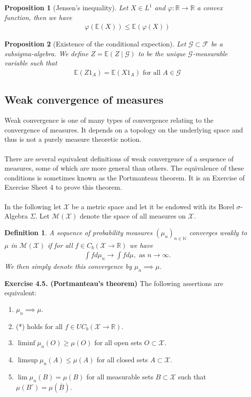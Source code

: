 \documentclass[11pt,a4paper, final]{article}
\newtheorem{prop}{Proposition}[section]
\newtheorem{defn}{Definition}[section]
\theoremstyle{definition}
\begin{document}
\begin{prop}[Jensen's inequality] Let $X \in L^1$ and $\varphi: \mathbb{R} \to \mathbb{R}$ a convex function, then we have 
\begin{align*}
\varphi( \mathbb{E}(X)) \leq \mathbb{E}( \varphi(X))
\end{align*}
\end{prop}
\begin{prop}[Existence of the conditional expection] Let $\mathcal{G} \subset \mathcal{F}$ be a subsigma-algebra. We define $Z= \mathbb{E}(Z \mid \mathcal{G})$ to be the unique $\mathcal{G}$-measurable variable such that 
\begin{align*}
\mathbb{E}(Z 1_A) = \mathbb{E}(X 1_A) \text{ for all } A \in \mathcal{G}
\end{align*}
\end{prop}
\newpage
\subsection{Weak convergence of measures}
Weak convergence is one of many types of convergence relating to the convergence of measures. It depends on a topology on the underlying space and thus is not a purely measure theoretic notion. 
\\\\
There are several equivalent definitions of weak convergence of a sequence of measures, some of which are more general than others. The equivalence of these conditions is sometimes known as the Portmanteau theorem. It is an Exercise of Exercise Sheet 4 to prove this theorem.
\\\\
In the following let $\mathcal{X}$ be a metric space and let it be endowed with its Borel $\sigma$-Algebra $\Sigma$. Let $\mathcal{M}( \mathcal{X})$ denote the space of all measures on $\mathcal{X}$. 
\begin{defn} A sequence of probability measures $( \mu_n)_{n \in \mathbb{N}}$ converges weakly to $\mu$ in $\mathcal{M}( \mathcal{X})$ if for all $f \in C_b( \mathcal{X} \to \mathbb{R})$ we have
\begin{align*}
\int f d \mu_n \to \int f d \mu, \text{ as } n \to \infty. \tag{*}
\end{align*}
We then simply denote this convergence by $\mu_n \implies \mu$. 
\end{defn}
\noindent 
\textbf{Exercise 4.5. (Portmanteau's theorem)} The following assertions are equivalent:

\begin{enumerate}
\item $\mu_n \implies \mu$.
\item (*) holds for all $f \in UC_b( \mathcal{X} \to \mathbb{R})$.
\item $\liminf \mu_n(O) \geq \mu (O)$ for all open sets $O \subset \mathcal{X}$. 
\item $\limsup \mu_n(A) \leq \mu (A)$ for all closed sets $A \subset \mathcal{X}$. 
\item $\lim \mu_n(B) = \mu(B)$ for all measurable sets $B \subset \mathcal{X}$ such that $\mu(B^\circ)= \mu( \overline{B})$. 
\end{enumerate}
\newpage
\end{document}
